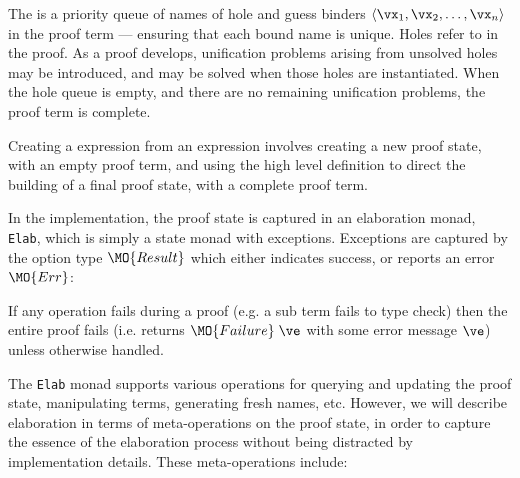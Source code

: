 The  is a priority queue of names of hole and guess binders 
$\langle\vx_1,\vx_2,\ldots,\vx_n\rangle$
in the proof term ---
ensuring that each bound name is unique. Holes refer to 
in the proof. As a proof develops, unification problems arising from unsolved
holes may be introduced, and may be solved when those holes are instantiated.
When the hole queue is empty, and there are no remaining unification 
problems, the proof term is complete.

Creating a \TT{} expression from an \Idris{} expression involves creating
a new proof state, with an empty proof term, and using the high level definition
to direct the building of a final proof state, with a complete proof term.

In the implementation, the proof state is captured in an elaboration monad,
\texttt{Elab}, which is simply a state monad with exceptions. 
Exceptions are captured by the option type $\MO{Result}$ which
either indicates success, or reports an error $\MO{Err}$:


\noindent
If any operation fails during a proof (e.g. a sub term fails to type check)
then the entire proof fails (i.e. returns $\MO{Failure}\;\ve$ with some error
message $\ve$) unless otherwise handled.

The \texttt{Elab} monad supports various operations for querying and updating
the proof state, manipulating terms, generating fresh names, etc. However, we
will describe \Idris{} elaboration in terms of meta-operations on the proof
state, in order to capture the essence of the elaboration process without being
distracted by implementation details. These meta-operations include: 

